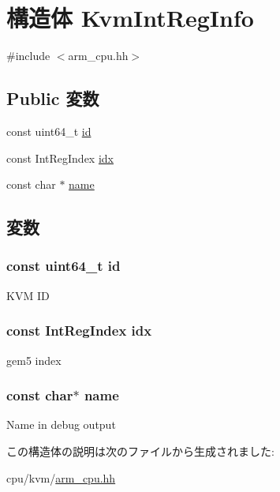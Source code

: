 \hypertarget{structArmKvmCPU_1_1KvmIntRegInfo}{
\section{構造体 KvmIntRegInfo}
\label{structArmKvmCPU_1_1KvmIntRegInfo}
}


{\ttfamily \#include $<$arm\_\-cpu.hh$>$}\subsection*{Public 変数}
\begin{DoxyCompactItemize}
\item 
const uint64\_\-t \hyperlink{structArmKvmCPU_1_1KvmIntRegInfo_a009b405b4dfece21e45ce92ab8d9adb0}{id}
\item 
const IntRegIndex \hyperlink{structArmKvmCPU_1_1KvmIntRegInfo_a372bdaf636df4198881d3d456d0eea56}{idx}
\item 
const char $\ast$ \hyperlink{structArmKvmCPU_1_1KvmIntRegInfo_a8f8f80d37794cde9472343e4487ba3eb}{name}
\end{DoxyCompactItemize}


\subsection{変数}
\hypertarget{structArmKvmCPU_1_1KvmIntRegInfo_a009b405b4dfece21e45ce92ab8d9adb0}{
\subsubsection[{id}]{\setlength{\rightskip}{0pt plus 5cm}const uint64\_\-t {\bf id}}}
\label{structArmKvmCPU_1_1KvmIntRegInfo_a009b405b4dfece21e45ce92ab8d9adb0}
KVM ID \hypertarget{structArmKvmCPU_1_1KvmIntRegInfo_a372bdaf636df4198881d3d456d0eea56}{
\subsubsection[{idx}]{\setlength{\rightskip}{0pt plus 5cm}const IntRegIndex {\bf idx}}}
\label{structArmKvmCPU_1_1KvmIntRegInfo_a372bdaf636df4198881d3d456d0eea56}
gem5 index \hypertarget{structArmKvmCPU_1_1KvmIntRegInfo_a8f8f80d37794cde9472343e4487ba3eb}{
\subsubsection[{name}]{\setlength{\rightskip}{0pt plus 5cm}const char$\ast$ {\bf name}}}
\label{structArmKvmCPU_1_1KvmIntRegInfo_a8f8f80d37794cde9472343e4487ba3eb}
Name in debug output 

この構造体の説明は次のファイルから生成されました:\begin{DoxyCompactItemize}
\item 
cpu/kvm/\hyperlink{arm__cpu_8hh}{arm\_\-cpu.hh}\end{DoxyCompactItemize}
